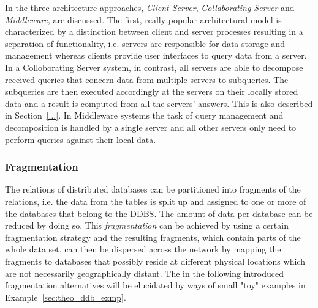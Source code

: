 In \citet[p.~608f.]{Ramakrish2000} the three architecture approaches, \emph{Client-Server}, \emph{Collaborating Server} and \emph{Middleware}, are 
discussed. The first, really popular architectural model is characterized by a distinction between client and server processes resulting in a separation of
functionality, i.e. servers are responsible for data storage and management whereas clients provide user interfaces to query data from a server. In a
Colloborating Server system, in contrast, all servers are able to decompose received queries that concern data from multiple servers to subqueries. The
subqueries are then executed accordingly at the servers on their locally stored data and a result is computed from all the servers' answers. This is also
described in Section~\ref{...}. 
In Middleware systems the task of query management and decomposition is handled by a single server and all other servers only need to perform queries against
their local data.



\subsubsection{Fragmentation}
\label{sec:theo_ddb_frag}
The relations of distributed databases can be partitioned into fragments of the relations, i.e. the data from the tables is split up and assigned to one or 
more of the databases that belong to the DDBS. The amount of data per database can be reduced by doing so. This \emph{fragmentation} can be achieved by using
a certain fragmentation strategy and the resulting fragments, which contain parts of the whole data set, can then be dispersed across the network by mapping
the fragments to databases that possibly reside at different physical locations which are not necessarily geographically distant. The in the following 
introduced fragmentation alternatives will be elucidated by ways of small "toy" examples in Example~\ref{sec:theo_ddb_exmp}.

